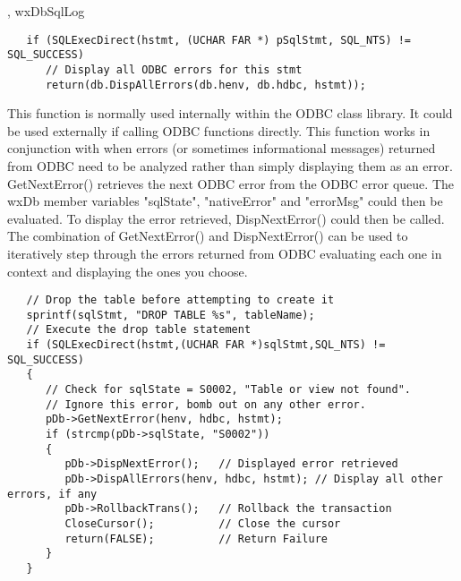 
, wxDbSqlLog

\begin{verbatim}
   if (SQLExecDirect(hstmt, (UCHAR FAR *) pSqlStmt, SQL_NTS) != SQL_SUCCESS)
      // Display all ODBC errors for this stmt
      return(db.DispAllErrors(db.henv, db.hdbc, hstmt));
\end{verbatim}


\label{wxdbdispnexterror}



This function is normally used internally within the ODBC class library.
It could be used externally if calling ODBC functions directly.  This
function works in conjunction with  when errors (or
sometimes informational messages)  returned from ODBC need to be analyzed
rather than simply displaying them as an error.  GetNextError() retrieves
the next ODBC error from the ODBC error queue.  The wxDb member variables
"sqlState", "nativeError" and "errorMsg" could then be evaluated.  To
display the error retrieved, DispNextError() could then be called.
The combination of GetNextError() and DispNextError() can be used to
iteratively step through the errors returned from ODBC evaluating each
one in context and displaying the ones you choose.


\begin{verbatim}
   // Drop the table before attempting to create it
   sprintf(sqlStmt, "DROP TABLE %s", tableName);
   // Execute the drop table statement
   if (SQLExecDirect(hstmt,(UCHAR FAR *)sqlStmt,SQL_NTS) != SQL_SUCCESS)
   {
      // Check for sqlState = S0002, "Table or view not found".
      // Ignore this error, bomb out on any other error.
      pDb->GetNextError(henv, hdbc, hstmt);
      if (strcmp(pDb->sqlState, "S0002"))
      {
         pDb->DispNextError();   // Displayed error retrieved
         pDb->DispAllErrors(henv, hdbc, hstmt); // Display all other errors, if any
         pDb->RollbackTrans();   // Rollback the transaction
         CloseCursor();          // Close the cursor
         return(FALSE);          // Return Failure
      }
   }
\end{verbatim}


\label{wxdbdropview}

